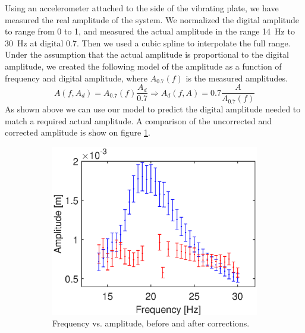 \documentclass[12pt,oneside,a4paper]{article}
\numberwithin{equation}{section}
\begin{document}
{{{{Using an accelerometer attached to the side of the vibrating plate, we have measured the real amplitude of the system. We normalized the digital amplitude to range from 0 to 1, and measured the actual amplitude in the range \SI{14}{Hz} to \SI{30}{Hz} at digital 0.7. Then we used a cubic spline to interpolate the full range. Under the assumption that the actual amplitude is proportional to the digital amplitude, we created the following model of the amplitude as a function of frequency and digital amplitude, where $A_{0.7}(f)$ is the measured amplitudes.
\begin{equation}
	A(f,A_{d}) = A_{0.7}(f)\frac{A_{d}}{0.7} \Rightarrow A_d(f,A) = 0.7\frac{A}{A_{0.7}(f)}
	\label{ampl_model}
\end{equation}
As shown above we can use our model to predict the digital amplitude needed to match a required actual amplitude. A comparison of the uncorrected and corrected amplitude is show on figure \ref{frq_vs_ampl_plot}.
\begin{figure}[h]
	\centering
	\begin{subfigure}[t]{0.49\textwidth}
		\centering
		\includegraphics[width=\textwidth]{amplcorr.eps} 
		\caption{Frequency vs. amplitude, before and after corrections.}
		\label{frq_vs_ampl_plot}
	\end{subfigure}\hfill
	\begin{subfigure}[t]{0.49\textwidth}
		\centering

\end{subfigure}
\end{figure}}}}}
\end{document}
